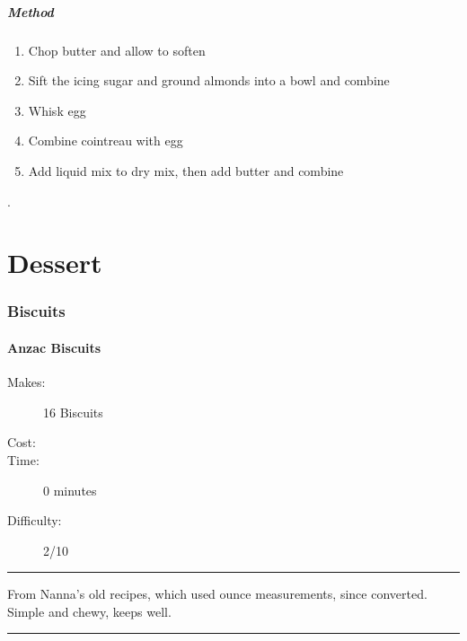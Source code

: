 \documentclass[]{article}
\begin{document}
\subsubsection*{\Large Method}
\begin{enumerate}[font=\huge\color{accent}]
	\item Chop butter and allow to soften
	\item Sift the icing sugar and ground almonds into a bowl and combine
	\item Whisk egg
	\item Combine cointreau with egg
	\item Add liquid mix to dry mix, then add butter and combine
\end{enumerate}
\newpage

\newpage
\color{white}.\color{black}
\vspace{5cm}
\part{\Huge Dessert}
\newpage
{}
\section*{\center\Huge\color{accent}Biscuits}
\label{cat:Biscuits}
\label{rec:Anzac Biscuits}
\subsection*{\center\huge Anzac Biscuits}
\begin{description}
\item[Makes:] 16 Biscuits
\item[Cost:] \textdollar
\item[Time:] 0 minutes
\item[Difficulty:] 2/10
\end{description}
\vspace{0.2cm}\hrule\vspace{0.5cm}
\begin{adjustwidth}{0.5 cm}{0.5 cm}

From Nanna’s old recipes, which used ounce measurements, since converted. Simple and chewy, keeps well.  \hfill\color{accent}{\Large\faVimeoSquare\hspace{0.1cm}\faTruck\hspace{0.1cm}}\color{black}

\end{adjustwidth}
\vspace{0.5cm}\hrule
\end{document}
